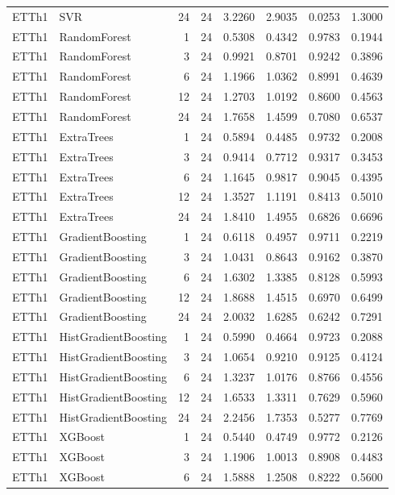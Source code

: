 \begin{tabular}{llrrrrrr}
ETTh1 & SVR & 24 & 24 & 3.2260 & 2.9035 & 0.0253 & 1.3000 \\
ETTh1 & RandomForest & 1 & 24 & 0.5308 & 0.4342 & 0.9783 & 0.1944 \\
ETTh1 & RandomForest & 3 & 24 & 0.9921 & 0.8701 & 0.9242 & 0.3896 \\
ETTh1 & RandomForest & 6 & 24 & 1.1966 & 1.0362 & 0.8991 & 0.4639 \\
ETTh1 & RandomForest & 12 & 24 & 1.2703 & 1.0192 & 0.8600 & 0.4563 \\
ETTh1 & RandomForest & 24 & 24 & 1.7658 & 1.4599 & 0.7080 & 0.6537 \\
ETTh1 & ExtraTrees & 1 & 24 & 0.5894 & 0.4485 & 0.9732 & 0.2008 \\
ETTh1 & ExtraTrees & 3 & 24 & 0.9414 & 0.7712 & 0.9317 & 0.3453 \\
ETTh1 & ExtraTrees & 6 & 24 & 1.1645 & 0.9817 & 0.9045 & 0.4395 \\
ETTh1 & ExtraTrees & 12 & 24 & 1.3527 & 1.1191 & 0.8413 & 0.5010 \\
ETTh1 & ExtraTrees & 24 & 24 & 1.8410 & 1.4955 & 0.6826 & 0.6696 \\
ETTh1 & GradientBoosting & 1 & 24 & 0.6118 & 0.4957 & 0.9711 & 0.2219 \\
ETTh1 & GradientBoosting & 3 & 24 & 1.0431 & 0.8643 & 0.9162 & 0.3870 \\
ETTh1 & GradientBoosting & 6 & 24 & 1.6302 & 1.3385 & 0.8128 & 0.5993 \\
ETTh1 & GradientBoosting & 12 & 24 & 1.8688 & 1.4515 & 0.6970 & 0.6499 \\
ETTh1 & GradientBoosting & 24 & 24 & 2.0032 & 1.6285 & 0.6242 & 0.7291 \\
ETTh1 & HistGradientBoosting & 1 & 24 & 0.5990 & 0.4664 & 0.9723 & 0.2088 \\
ETTh1 & HistGradientBoosting & 3 & 24 & 1.0654 & 0.9210 & 0.9125 & 0.4124 \\
ETTh1 & HistGradientBoosting & 6 & 24 & 1.3237 & 1.0176 & 0.8766 & 0.4556 \\
ETTh1 & HistGradientBoosting & 12 & 24 & 1.6533 & 1.3311 & 0.7629 & 0.5960 \\
ETTh1 & HistGradientBoosting & 24 & 24 & 2.2456 & 1.7353 & 0.5277 & 0.7769 \\
ETTh1 & XGBoost & 1 & 24 & 0.5440 & 0.4749 & 0.9772 & 0.2126 \\
ETTh1 & XGBoost & 3 & 24 & 1.1906 & 1.0013 & 0.8908 & 0.4483 \\
ETTh1 & XGBoost & 6 & 24 & 1.5888 & 1.2508 & 0.8222 & 0.5600 \\

\end{tabular}
